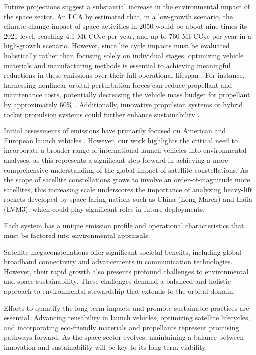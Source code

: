 \documentclass[pdflatex,sn-mathphys-num]{sn-jnl}
\theoremstyle{thmstyleone}%
\theoremstyle{thmstyletwo}%
\theoremstyle{thmstylethree}%
\begin{document}
Future projections suggest a substantial increase in the environmental impact of the space sector. An LCA by \citet{miraux_environmental_2022-1} estimated that, in a low-growth scenario, the climate change impact of space activities in 2050 would be about nine times its 2021 level, reaching 4.1 Mt CO$_2$e per year, and up to 760 Mt CO$_2$e per year in a high-growth scenario. However, since life cycle impacts must be evaluated holistically rather than focusing solely on individual stages, optimizing vehicle materials and manufacturing methods is essential to achieving meaningful reductions in these emissions over their full operational lifespan \citep{kirchain_jr_environmental_2017}. For instance, harnessing nonlinear orbital perturbation forces can reduce propellant and maintenance costs, potentially decreasing the vehicle mass budget for propellant by approximately 60\% \citep{singh_low_2020}. Additionally, innovative propulsion systems or hybrid rocket propulsion systems could further enhance sustainability \citep{barato_review_2023}.

Initial assessments of emissions have primarily focused on American \citep{harris_space_2019} and European launch vehicles \citep{maury_application_2020}. However, our work highlights the critical need to incorporate a broader range of international launch vehicles into environmental analyses, as this represents a significant step forward in achieving a more comprehensive understanding of the global impact of satellite constellations. As the scope of satellite constellations grows to involve an order-of-magnitude more satellites, this increasing scale underscores the importance of analyzing heavy-lift rockets developed by space-faring nations such as China (Long March) and India (LVM3), which could play significant roles in future deployments.

Each system has a unique emission profile and operational characteristics that must be factored into environmental appraisals.

Satellite megaconstellations offer significant societal benefits, including global broadband connectivity and advancements in communication technologies. However, their rapid growth also presents profound challenges to environmental and space sustainability. These challenges demand a balanced and holistic approach to environmental stewardship that extends to the orbital domain. 

Efforts to quantify the long-term impacts and promote sustainable practices are essential. Advancing reusability in launch vehicles, optimizing satellite lifecycles, and incorporating eco-friendly materials and propellants represent promising pathways forward. As the space sector evolves, maintaining a balance between innovation and sustainability will be key to its long-term viability.
\end{document}
